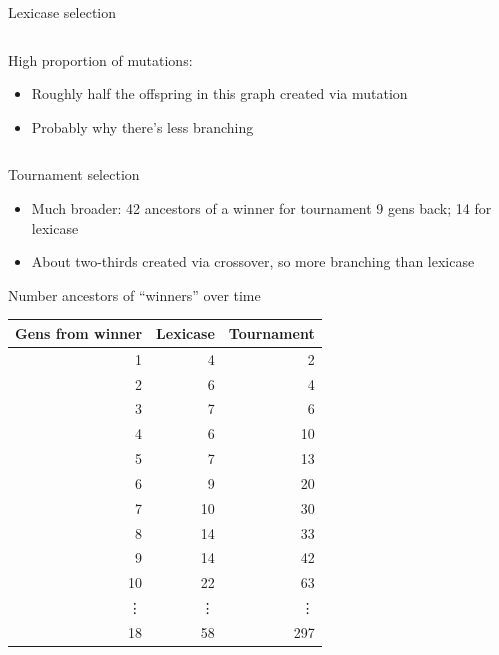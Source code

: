 \documentclass{beamer}
\begin{document}
\begin{frame}{Lexicase selection}
\begin{columns}
\begin{column}{0.45 \linewidth}
\begin{overprint}
			High proportion of mutations:
			\begin{itemize}
				\item Roughly half the offspring in this graph created via mutation
				\item Probably why there's less branching
			\end{itemize}
			
			\end{overprint}
		\end{column}
	\end{columns}
\end{frame}

\begin{frame}{Tournament selection}
	\vspace{-1cm}
	\begin{itemize}
		\item Much broader: 42 ancestors of a winner for tournament 9 gens back; 14 for lexicase
		\item About two-thirds created via crossover, so more branching than lexicase
	\end{itemize}
\end{frame}

\begin{frame}{Number ancestors of ``winners'' over time}
		\begin{center}
			\begin{tabular}{rrr}
				Gens from winner & Lexicase & Tournament \\
				\hline\noalign{\smallskip}                
                1 & 4 & 2 \\
                2 & 6 & 4 \\
                3 & 7 & 6 \\
                4 & 6 & 10 \\
                5 & 7 & 13 \\
                6 & 9 & 20 \\
                7 & 10 & 30 \\
                8 & 14 & 33 \\
                9 & 14 & 42 \\
                10 & 22 & 63 \\ 
                \vdots & \vdots & \vdots \\ 
                18 & 58 & 297 \\
			\end{tabular}
		\end{center}
\end{frame}
\end{document}
